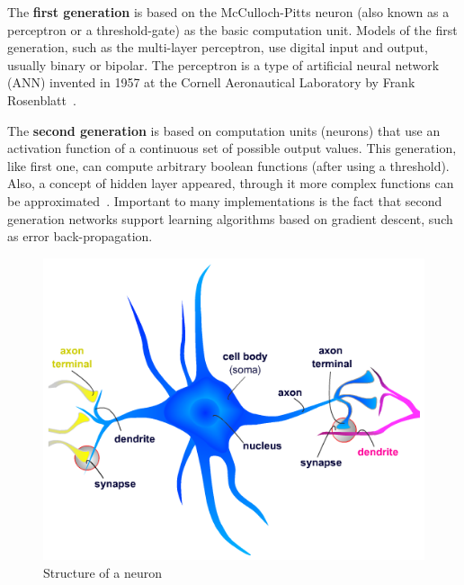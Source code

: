 The \textbf{first generation} is based on the McCulloch-Pitts neuron (also known as a perceptron or a threshold-gate) as the basic computation unit. Models of the first generation, such as the multi-layer perceptron, use digital input and output, usually binary or bipolar. The perceptron is a type of artificial neural network (ANN) invented in 1957 at the Cornell Aeronautical Laboratory by Frank Rosenblatt~\cite{Rosenblatt1960}.

The \textbf{second generation} is based on computation units (neurons) that use an activation function of a continuous set of possible output values. This generation, like first one, can compute arbitrary boolean functions (after using a threshold). Also, a concept of hidden layer appeared, through it more complex functions can be approximated~\cite{Rosenblatt1962}. Important to many implementations is the fact that second generation networks support learning algorithms based on gradient descent, such as error back-propagation.

\begin{figure}[ht]
    \centering
    \includegraphics[scale=0.6]{images/Figure2NeuronStructure.png}
    \caption{Structure of a neuron}
    \label{fig:NeuronStructure}
\end{figure}

